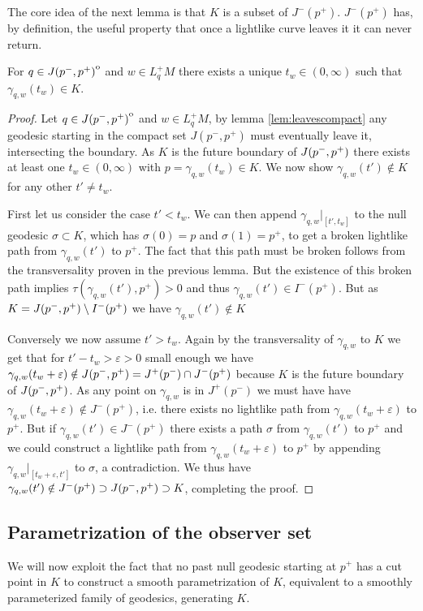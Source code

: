The core idea of the next lemma is that $K$ is a subset of $J^-(p^+)$. $J^-(p^+)$ has, by definition, the useful property that once a lightlike curve leaves it it can never return.
\begin{lemma}\label{lem:hitsonce}
    For $q\in {\kern0ptJ(p^-,p^+)}^{\mathrm{o}}$ and $w\in L^+_qM$ there exists a unique $t_w\in (0,\infty)$ such that $\gamma_{q,w}(t_w)\in K$.
\end{lemma}
\begin{proof}
    Let $q\in {\kern0ptJ(p^-,p^+)}^{\mathrm{o}}$ and $w\in L^+_qM$, by lemma \ref{lem:leavescompact} any geodesic starting in the compact set $J(p^-,p^+)$ must eventually leave it, intersecting the boundary. As $K$ is the future boundary of $J(p^-,p^+)$ there exists at least one $t_w\in (0,\infty)$ with $p=\gamma_{q,w}(t_w)\in K$. We now show $\gamma_{q,w}(t')\notin K$ for any other $t'\neq t_w$.

    First let us consider the case $t'<t_w$. We can then append $\gamma_{q,w}\rvert_{[t',t_w]}$ to the null geodesic $\sigma\subset K$, which has $\sigma(0)=p$ and $\sigma(1)=p^+$, to get a broken lightlike path from $\gamma_{q,w}(t')$ to $p^+$. The fact that this path must be broken follows from the transversality proven in the previous lemma. But the existence of this broken path implies $\tau(\gamma_{q,w}(t'),p^+)>0$ and thus $\gamma_{q,w}(t')\in I^-(p^+)$. But as $K=J(p^-,p^+)\setminus I^-(p^+)$ we have $\gamma_{q,w}(t')\notin K$

    Conversely we now assume $t'>t_w$. Again by the transversality of $\gamma_{q,w}$ to $K$ we get that for $t'-t_w>\varepsilon>0$ small enough we have $\gamma_{q,w}(t_w+\varepsilon)\notin J(p^-,p^+)=J^+(p^-)\cap J^-(p^+)$ because $K$ is the future boundary of $J(p^-,p^+)$. As any point on $\gamma_{q,w}$ is in $J^+(p^-)$ we must have have $\gamma_{q,w}(t_w+\varepsilon) \notin J^-(p^+)$, i.e. there exists no lightlike path from $\gamma_{q,w}(t_w+\varepsilon)$ to $p^+$. But if $\gamma_{q,w}(t')\in J^-(p^+)$ there exists a path $\sigma$ from $\gamma_{q,w}(t')$ to $p^+$ and we could construct a lightlike path from $\gamma_{q,w}(t_w+\varepsilon)$ to $p^+$ by appending $\gamma_{q,w}\rvert_{[t_w+\varepsilon,t']}$ to  $\sigma$, a contradiction. We thus have $\gamma_{q,w}(t')\notin J^-(p^+)\supset J(p^-,p^+)\supset K$, completing the proof.
\end{proof}

\subsection{Parametrization of the observer set}
We will now exploit the fact that no past null geodesic starting at $p^+$ has a cut point in $K$ to construct a smooth parametrization of $K$, equivalent to a smoothly parameterized family of geodesics, generating $K$.


